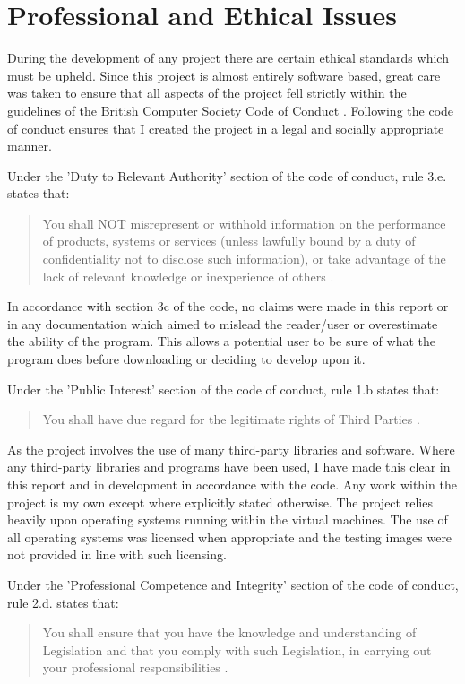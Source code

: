 \chapter{Professional and Ethical Issues}
During the development of any project there are certain ethical standards which must be upheld. Since this project is almost entirely software based, great care was taken to ensure that all aspects of the project fell strictly within the guidelines of the British Computer Society Code of Conduct \cite{bcs}. Following the code of conduct ensures that I created the project in a legal and socially appropriate manner.

Under the 'Duty to Relevant Authority' section of the code of conduct, rule 3.e. states that:
\begin{quote}
    You shall NOT misrepresent or withhold information on the performance of products, systems or services (unless lawfully bound by a duty of confidentiality not to disclose such information), or take advantage of the lack of relevant knowledge or inexperience of others \cite{bcs}.
\end{quote}

In accordance with section 3c of the code, no claims were made in this report or in any documentation which aimed to mislead the reader/user or overestimate the ability of the program. This allows a potential user to be sure of what the program does before downloading or deciding to develop upon it. 

Under the 'Public Interest' section of the code of conduct, rule 1.b states that:
\begin{quote}
    You shall have due regard for the legitimate rights of Third Parties \cite{bcs}.
\end{quote}

As the project involves the use of many third-party libraries and software. Where any third-party libraries and programs have been used, I have made this clear in this report and in development in accordance with the code. Any work within the project is my own except where explicitly stated otherwise. The project relies heavily upon operating systems running within the virtual machines. The use of all operating systems was licensed when appropriate and the testing images were not provided in line with such licensing.

Under the 'Professional Competence and Integrity' section of the code of conduct, rule 2.d. states that:

\begin{quote}
    You shall ensure that you have the knowledge and understanding of Legislation and that you comply with such Legislation, in carrying out your professional responsibilities  \cite{bcs}.  
\end{quote}


